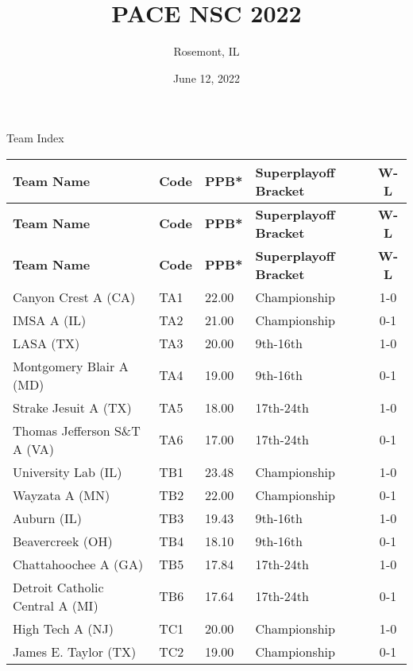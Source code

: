 \documentclass{article}%
\title{PACE NSC 2022}%
\author{Rosemont, IL}%
\date{June 12, 2022}%
\begin{document}
%
\normalsize%
%
\maketitle%
\vspace*{48pt}%
\begin{center}%
\begin{Huge}%
Team Index%
\end{Huge}%
\end{center}%
\newpage%
\pagestyle{fancy}%
\fancyhf{}%
%
%
%
%
%
%
\begin{longtable}{|llllc|}%
\rowcolor{gray!30}%
\hline%
\textbf{Team Name} & \textbf{Code}&\textbf{PPB*}&\textbf{Superplayoff Bracket}&\textbf{W-L}\\%
\hline%
\endhead%
\hline%
\rowcolor{gray!25}%
\textbf{Team Name} & \textbf{Code}&\textbf{PPB*}&\textbf{Superplayoff Bracket}&\textbf{W-L}\\%
\hline%
\endfoot%
\hline%
\hline\rowcolor{gray!25}%
\textbf{Team Name} & \textbf{Code}&\textbf{PPB*}&\textbf{Superplayoff Bracket}&\textbf{W-L}\\%
\hline%
\endlastfoot%
\hline%
Canyon Crest A (CA)&TA1&22.00&Championship&1{-}0\\%
IMSA A (IL)&TA2&21.00&Championship&0{-}1\\%
LASA (TX)&TA3&20.00&9th{-}16th&1{-}0\\%
Montgomery Blair A (MD)&TA4&19.00&9th{-}16th&0{-}1\\%
Strake Jesuit A (TX)&TA5&18.00&17th{-}24th&1{-}0\\%
Thomas Jefferson S\&T A (VA)&TA6&17.00&17th{-}24th&0{-}1\\%
University Lab (IL)&TB1&23.48&Championship&1{-}0\\%
Wayzata A (MN)&TB2&22.00&Championship&0{-}1\\%
Auburn (IL)&TB3&19.43&9th{-}16th&1{-}0\\%
Beavercreek (OH)&TB4&18.10&9th{-}16th&0{-}1\\%
Chattahoochee A (GA)&TB5&17.84&17th{-}24th&1{-}0\\%
Detroit Catholic Central A (MI)&TB6&17.64&17th{-}24th&0{-}1\\%
High Tech A (NJ)&TC1&20.00&Championship&1{-}0\\%
James E. Taylor (TX)&TC2&19.00&Championship&0{-}1\\%

\end{longtable}
\end{document}
